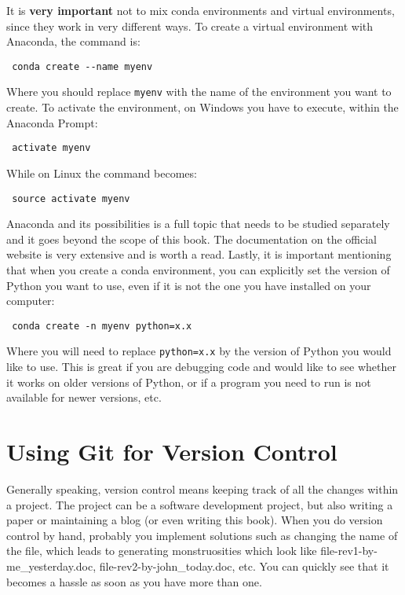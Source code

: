 It is \textbf{very important} not to mix conda environments and virtual environments, since they work in very different ways. To create a virtual environment with Anaconda, the command is:
\begin{verbatim}
 conda create --name myenv
\end{verbatim}

Where you should replace \texttt{myenv} with the name of the environment you want to create. To activate the environment, on Windows you have to execute, within the Anaconda Prompt:
\begin{verbatim}
 activate myenv
\end{verbatim}

While on Linux the command becomes:
\begin{verbatim}
 source activate myenv
\end{verbatim}

Anaconda and its possibilities is a full topic that needs to be studied separately and it goes beyond the scope of this book. The documentation on the official website is very extensive and is worth a read. Lastly, it is important mentioning that when you create a conda environment, you can explicitly set the version of Python you want to use, even if it is not the one you have installed on your computer:

\begin{verbatim}
 conda create -n myenv python=x.x
\end{verbatim}

Where you will need to replace \texttt{python=x.x} by the version of Python you would like to use. This is great if you are debugging code and would like to see whether it works on older versions of Python, or if a program you need to run is not available for newer versions, etc.

\section{Using Git for Version Control}
Generally speaking, version control means keeping track of all the changes within a project. The project can be a software development project, but also writing a paper or maintaining a blog (or even writing this book). When you do version control by hand, probably you implement solutions such as changing the name of the file, which leads to generating monstruosities which look like file-rev1-by-me\_yesterday.doc, file-rev2-by-john\_today.doc, etc. You can quickly see that it becomes a hassle as soon as you have more than one.

